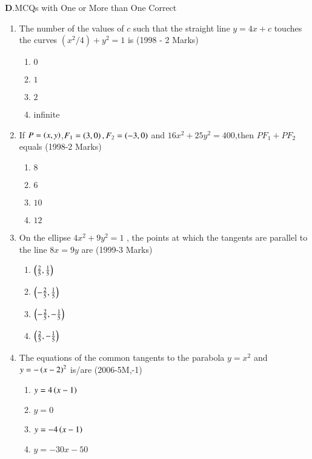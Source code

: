 \documentclass[journal,12pt,onecolumn]{IEEEtran}
\theoremstyle{remark}
\begin{document}
		\textbf{D}.MCQs with One or More than One Correct
		\vspace{0.5cm}
\begin{enumerate}
\item The number of the values of $c$ such that the straight line $y=4x+c$ touches the curves $(x^2/4)+y^2=1$ is \hfill(1998 - 2 Marks)\\
	\begin{enumerate}
	\item $0$
	\item $1$
	\item $2$
	\item infinite
	\end{enumerate}

\item If $P=\left(x,y\right)$,$F_{1}=\left(3,0\right),F_{2}=\left(-3,0\right)$ and $16x^2+25y^2=400$,then $PF_{1}+PF_{2}$ equals \hfill(1998-2 Marks)\\
	\begin{enumerate}
		\item $8$
		\item $6$
		\item $10$
		\item $12$
	\end{enumerate}

\item On the ellipse $4x^2+9y^2=1$ , the points at which the tangents are parallel to the line $8x=9y$ are \hfill(1999-3 Marks)\\
	\begin{enumerate}
		\item $\left(\frac{2}{5},\frac{1}{5}\right)$
		\item $\left(-\frac{2}{5},\frac{1}{5}\right)$
		\item $\left(-\frac{2}{5},-\frac{1}{5}\right)$
		\item $\left(\frac{2}{5},-\frac{1}{5}\right)$
	\end{enumerate}

\item The equations of the common tangents to the parabola $y=x^2$ and $y=-\left(x-2\right)^2$ is/are \hfill(2006-5M,-1)\\
	\begin{enumerate}
		\item $y=4\left(x-1\right)$
		\item $y=0$
		\item $y=-4\left(x-1\right)$
		\item $y=-30x-50$
	\end{enumerate}


\end{enumerate}
\end{document}
